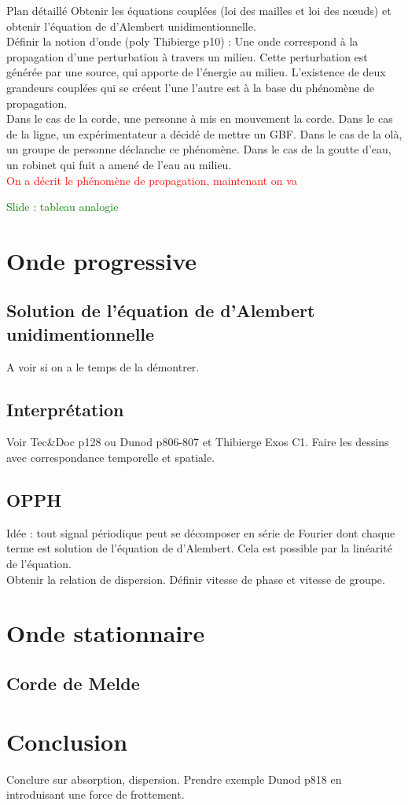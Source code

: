 \begin{reportBlock}{Plan détaillé}
  Obtenir les équations couplées (loi des mailles et loi des n\oe uds) et obtenir l'équation de d'Alembert unidimentionnelle.\\

  Définir la notion d'onde (poly Thibierge p10) : \og Une onde correspond à la propagation d’une perturbation à travers un milieu. Cette perturbation est générée par une source, qui apporte de l’énergie au milieu. L'existence de deux grandeurs couplées qui se créent l'une l'autre est à la base du phénomène de propagation.\\

  Dans le cas de la corde, une personne à mis en mouvement la corde. Dans le cas de la ligne, un expérimentateur a décidé de mettre un GBF. Dans le cas de la olà, un groupe de personne déclanche ce phénomène. Dans le cas de la goutte d'eau, un robinet qui fuit a amené de l'eau au milieu.\\

  \textcolor{red}{On a décrit le phénomène de propagation, maintenant on va }
  
  \textcolor{green}{Slide : tableau analogie}
  

  \section{Onde progressive}
  \subsection{Solution de l'équation de d'Alembert unidimentionnelle}
  A voir si on a le temps de la démontrer.
  
  \subsection{Interprétation}
  Voir Tec\&Doc p128 ou Dunod p806-807 et Thibierge Exos C1. Faire les dessins avec correspondance temporelle et spatiale.

  \subsection{OPPH}
  Idée : tout signal périodique peut se décomposer en série de Fourier dont chaque terme est solution de l'équation de d'Alembert. Cela est possible par la linéarité de l'équation.\\
  Obtenir la relation de dispersion. Définir vitesse de phase et vitesse de groupe. 
  
  \section{Onde stationnaire}
  

  \subsection{Corde de Melde}

  \section{Conclusion}
  Conclure sur absorption, dispersion. Prendre exemple Dunod p818 en introduisant une force de frottement.


\end{reportBlock}